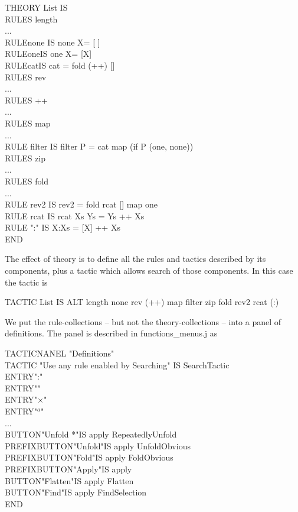 \documentclass[11pt]{book}
\newcommand{\tab}{\hspace{5mm}}
\begin{document}
THEORY List IS\\
\tab RULES length \\
\tab ...\\
\tab RULE\tab none \tab IS none X\tab = [ ]\\
\tab RULE\tab one\tab IS one X\tab = [X]\\
\tab RULE\tab cat\tab IS cat = fold (++) []\\
\tab RULES rev\\
\tab ...\\
\tab RULES ++\\
\tab ...\\
\tab RULES map\\
\tab ...\\
\tab RULE filter IS filter P = cat {\textbullet} map (if P (one, none))\\
\tab RULES zip\\
\tab ...\\
\tab RULES fold \\
\tab ...\\
\tab RULE rev2 IS rev2 = fold rcat [] {\textbullet} map one\\
\tab RULE rcat IS rcat Xs Ys = Ys ++ Xs\\
\tab RULE ":" IS X:Xs = [X] ++ Xs\\
END


The effect of theory is to define all the rules and tactics described by its components, plus a tactic which allows search of those components. In this case the tactic is

TACTIC List IS ALT length none rev (++) map filter zip fold rev2 rcat (:)


We put the rule-collections -- but not the theory-collections -- into a panel of definitions. The panel is described in functions\_menus.j as

TACTICNANEL "Definitions" \\
\tab TACTIC "Use any rule enabled by Searching" IS SearchTactic\\
\tab ENTRY\tab ":"\\
\tab ENTRY\tab "{\textbullet}"\tab  \\
\tab ENTRY\tab "$\times$"\tab  \\
\tab ENTRY\tab "\ensuremath{^a}"\tab  \\
\tab ...\\
\tab BUTTON\tab "Unfold *"\tab IS apply RepeatedlyUnfold\\
\tab PREFIXBUTTON\tab "Unfold"\tab IS apply UnfoldObvious\\
\tab PREFIXBUTTON\tab "Fold"\tab IS apply FoldObvious\\
\tab PREFIXBUTTON\tab "Apply"\tab IS apply\\
\tab BUTTON\tab "Flatten"\tab IS apply Flatten\\
\tab BUTTON\tab "Find"\tab IS apply FindSelection\\
END
\end{document}
